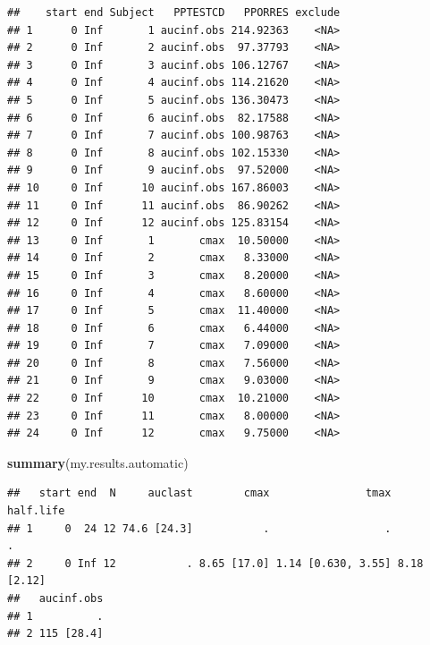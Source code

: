 \documentclass[]{krantz}
\makeatletter
\newenvironment{Shaded}{\begin{snugshade}}{\end{snugshade}}
\newcommand{\KeywordTok}[1]{\textcolor[rgb]{0.13,0.29,0.53}{\textbf{#1}}}
\newcommand{\DataTypeTok}[1]{\textcolor[rgb]{0.13,0.29,0.53}{#1}}
\newcommand{\StringTok}[1]{\textcolor[rgb]{0.31,0.60,0.02}{#1}}
\newcommand{\OperatorTok}[1]{\textcolor[rgb]{0.81,0.36,0.00}{\textbf{#1}}}
\newcommand{\NormalTok}[1]{#1}
\newenvironment{kframe}{%
\medskip{}
\setlength{\fboxsep}{.8em}
 \def\at@end@of@kframe{}%
 \ifinner\ifhmode%
  \def\at@end@of@kframe{\end{minipage}}%
  \begin{minipage}{\columnwidth}%
 \fi\fi%
 \def\FrameCommand##1{\hskip\@totalleftmargin \hskip-\fboxsep
 \colorbox{shadecolor}{##1}\hskip-\fboxsep
     \hskip-\linewidth \hskip-\@totalleftmargin \hskip\columnwidth}%
 \MakeFramed {\advance\hsize-\width
   \@totalleftmargin\z@ \linewidth\hsize
   \@setminipage}}%
 {\par\unskip\endMakeFramed%
 \at@end@of@kframe}
\renewenvironment{Shaded}{\begin{kframe}}{\end{kframe}}
\theoremstyle{definition}
\theoremstyle{definition}
\theoremstyle{definition}
\theoremstyle{remark}
\makeatother
\begin{document}
\begin{Shaded}
\end{Shaded}

\begin{verbatim}
##    start end Subject   PPTESTCD   PPORRES exclude
## 1      0 Inf       1 aucinf.obs 214.92363    <NA>
## 2      0 Inf       2 aucinf.obs  97.37793    <NA>
## 3      0 Inf       3 aucinf.obs 106.12767    <NA>
## 4      0 Inf       4 aucinf.obs 114.21620    <NA>
## 5      0 Inf       5 aucinf.obs 136.30473    <NA>
## 6      0 Inf       6 aucinf.obs  82.17588    <NA>
## 7      0 Inf       7 aucinf.obs 100.98763    <NA>
## 8      0 Inf       8 aucinf.obs 102.15330    <NA>
## 9      0 Inf       9 aucinf.obs  97.52000    <NA>
## 10     0 Inf      10 aucinf.obs 167.86003    <NA>
## 11     0 Inf      11 aucinf.obs  86.90262    <NA>
## 12     0 Inf      12 aucinf.obs 125.83154    <NA>
## 13     0 Inf       1       cmax  10.50000    <NA>
## 14     0 Inf       2       cmax   8.33000    <NA>
## 15     0 Inf       3       cmax   8.20000    <NA>
## 16     0 Inf       4       cmax   8.60000    <NA>
## 17     0 Inf       5       cmax  11.40000    <NA>
## 18     0 Inf       6       cmax   6.44000    <NA>
## 19     0 Inf       7       cmax   7.09000    <NA>
## 20     0 Inf       8       cmax   7.56000    <NA>
## 21     0 Inf       9       cmax   9.03000    <NA>
## 22     0 Inf      10       cmax  10.21000    <NA>
## 23     0 Inf      11       cmax   8.00000    <NA>
## 24     0 Inf      12       cmax   9.75000    <NA>
\end{verbatim}

\begin{Shaded}
\begin{Highlighting}[]
\KeywordTok{summary}\NormalTok{(my.results.automatic)}
\end{Highlighting}
\end{Shaded}

\begin{verbatim}
##   start end  N     auclast        cmax               tmax   half.life
## 1     0  24 12 74.6 [24.3]           .                  .           .
## 2     0 Inf 12           . 8.65 [17.0] 1.14 [0.630, 3.55] 8.18 [2.12]
##   aucinf.obs
## 1          .
## 2 115 [28.4]
\end{verbatim}
\end{document}
